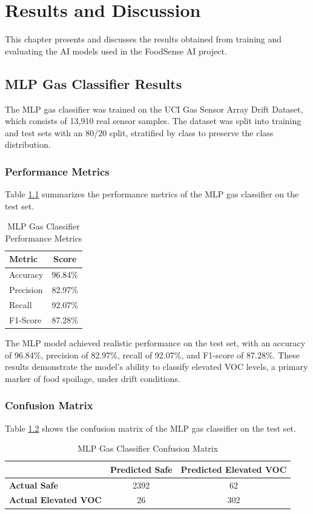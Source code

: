 \chapter{Results and Discussion}
This chapter presents and discusses the results obtained from training and evaluating the AI models used in the FoodSense AI project.

\section{MLP Gas Classifier Results}
The MLP gas classifier was trained on the UCI Gas Sensor Array Drift Dataset, which consists of 13,910 real sensor samples. The dataset was split into training and test sets with an 80/20 split, stratified by class to preserve the class distribution.

\subsection{Performance Metrics}
Table \ref{tab:mlp_results} summarizes the performance metrics of the MLP gas classifier on the test set.
\begin{table}[H]
\fontsize{10}{12}\selectfont
\centering
\caption{MLP Gas Classifier Performance Metrics}
\label{tab:mlp_results}
\begin{tabular}{|l|c|}
\hline
\textbf{Metric} & \textbf{Score} \\
\hline
Accuracy & 96.84\% \\
\hline
Precision & 82.97\% \\
\hline
Recall & 92.07\% \\
\hline
F1-Score & 87.28\% \\
\hline
\end{tabular}
\end{table}

The MLP model achieved realistic performance on the test set, with an accuracy of 96.84\%, precision of 82.97\%, recall of 92.07\%, and F1-score of 87.28\%. These results demonstrate the model's ability to classify elevated VOC levels, a primary marker of food spoilage, under drift conditions.

\subsection{Confusion Matrix}
Table \ref{tab:mlp_confusion} shows the confusion matrix of the MLP gas classifier on the test set.
\begin{table}[H]
\fontsize{10}{12}\selectfont
\centering
\caption{MLP Gas Classifier Confusion Matrix}
\label{tab:mlp_confusion}
\begin{tabular}{|l|c|c|}
\hline
 & \textbf{Predicted Safe} & \textbf{Predicted Elevated VOC} \\
\hline
\textbf{Actual Safe} & 2392 & 62 \\
\hline
\textbf{Actual Elevated VOC} & 26 & 302 \\
\hline
\end{tabular}
\end{table}

